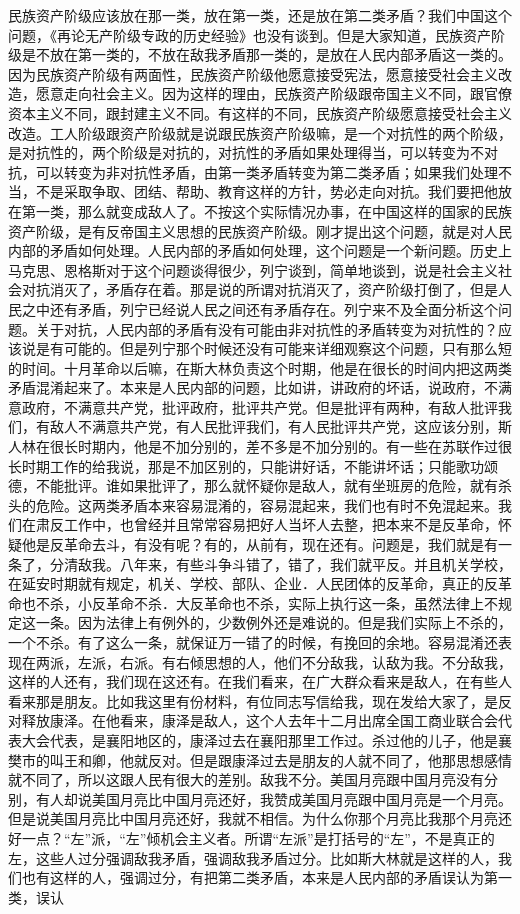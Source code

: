 民族资产阶级应该放在那一类，放在第一类，还是放在第二类矛盾？我们中国这个问题，《再论无产阶级专政的历史经验》也没有谈到。但是大家知道，民族资产阶级是不放在第一类的，不放在敌我矛盾那一类的，是放在人民内部矛盾这一类的。因为民族资产阶级有两面性，民族资产阶级他愿意接受宪法，愿意接受社会主义改造，愿意走向社会主义。因为这样的理由，民族资产阶级跟帝国主义不同，跟官僚资本主义不同，跟封建主义不同。有这样的不同，民族资产阶级愿意接受社会主义改造。工人阶级跟资产阶级就是说跟民族资产阶级嘛，是一个对抗性的两个阶级，是对抗性的，两个阶级是对抗的，对抗性的矛盾如果处理得当，可以转变为不对抗，可以转变为非对抗性矛盾，由第一类矛盾转变为第二类矛盾；如果我们处理不当，不是采取争取、团结、帮助、教育这样的方针，势必走向对抗。我们要把他放在第一类，那么就变成敌人了。不按这个实际情况办事，在中国这样的国家的民族资产阶级，是有反帝国主义思想的民族资产阶级。刚才提出这个问题，就是对人民内部的矛盾如何处理。人民内部的矛盾如何处理，这个问题是一个新问题。历史上马克思、恩格斯对于这个问题谈得很少，列宁谈到，简单地谈到，说是社会主义社会对抗消灭了，矛盾存在着。那是说的所谓对抗消灭了，资产阶级打倒了，但是人民之中还有矛盾，列宁已经说人民之间还有矛盾存在。列宁来不及全面分析这个问题。关于对抗，人民内部的矛盾有没有可能由非对抗性的矛盾转变为对抗性的？应该说是有可能的。但是列宁那个时候还没有可能来详细观察这个问题，只有那么短的时间。十月革命以后嘛，在斯大林负责这个时期，他是在很长的时间内把这两类矛盾混淆起来了。本来是人民内部的问题，比如讲，讲政府的坏话，说政府，不满意政府，不满意共产党，批评政府，批评共产党。但是批评有两种，有敌人批评我们，有敌人不满意共产党，有人民批评我们，有人民批评共产党，这应该分别，斯人林在很长时期内，他是不加分别的，差不多是不加分别的。有一些在苏联作过很长时期工作的给我说，那是不加区别的，只能讲好话，不能讲坏话；只能歌功颂德，不能批评。谁如果批评了，那么就怀疑你是敌人，就有坐班房的危险，就有杀头的危险。这两类矛盾本来容易混淆的，容易混起来，我们也有时不免混起来。我们在肃反工作中，也曾经并且常常容易把好人当坏人去整，把本来不是反革命，怀疑他是反革命去斗，有没有呢？有的，从前有，现在还有。问题是，我们就是有一条了，分清敌我。八年来，有些斗争斗错了，错了，我们就平反。并且机关学校，在延安时期就有规定，机关、学校、部队、企业．人民团体的反革命，真正的反革命也不杀，小反革命不杀．大反革命也不杀，实际上执行这一条，虽然法律上不规定这一条。因为法律上有例外的，少数例外还是难说的。但是我们实际上不杀的，一个不杀。有了这么一条，就保证万一错了的时候，有挽回的余地。容易混淆还表现在两派，左派，右派。有右倾思想的人，他们不分敌我，认敌为我。不分敌我，这样的人还有，我们现在这还有。在我们看来，在广大群众看来是敌人，在有些人看来那是朋友。比如我这里有份材料，有位同志写信给我，现在发给大家了，是反对释放康泽。在他看来，康泽是敌人，这个人去年十二月出席全国工商业联合会代表大会代表，是襄阳地区的，康泽过去在襄阳那里工作过。杀过他的儿子，他是襄樊市的叫王和卿，他就反对。但是跟康泽过去是朋友的人就不同了，他那思想感情就不同了，所以这跟人民有很大的差别。敌我不分。美国月亮跟中国月亮没有分别，有人却说美国月亮比中国月亮还好，我赞成美国月亮跟中国月亮是一个月亮。但是说美国月亮比中国月亮还好，我就不相信。为什么你那个月亮比我那个月亮还好一点？“左”派，“左”倾机会主义者。所谓“左派”是打括号的“左”，不是真正的左，这些人过分强调敌我矛盾，强调敌我矛盾过分。比如斯大林就是这样的人，我们也有这样的人，强调过分，有把第二类矛盾，本来是人民内部的矛盾误认为第一类，误认